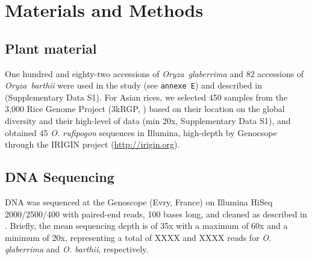 \documentclass[10pt,letterpaper]{article}
\begin{document}
% 
% 

\section*{Materials and Methods}

\subsection*{Plant material}
One hundred and eighty-two accessions of \emph{Oryza~glaberrima} and 82 accessions of \emph{Oryza~barthii} were used in the study (see \texttt{annexe E}) and described in \cite{Cubry2018} (Supplementary Data S1). For Asian rices, we selected 450 samples from the 3,000 Rice Genome Project (3kRGP, \cite{3kRGP}) based on their location on the global diversity and their high-level of data (min 20x, Supplementary Data S1), and obtained 45 \textit{O. rufipogon} sequences in Illumina, high-depth by Genocsope through the IRIGIN project (\url{http://irigin.org}). 

\subsection*{DNA Sequencing}
DNA was sequenced at the Genoscope (Evry, France) on Illumina HiSeq 2000/2500/400 with paired-end reads, 100 bases long, and cleaned as described in \cite{Cubry2018, Djedatin2017}. Briefly, the mean sequencing depth is of 35x with a maximum of 60x and a minimum of 20x, representing a total of XXXX and XXXX reads for \textit{O. glaberrima} and \textit{O. barthii}, respectively.
\end{document}

